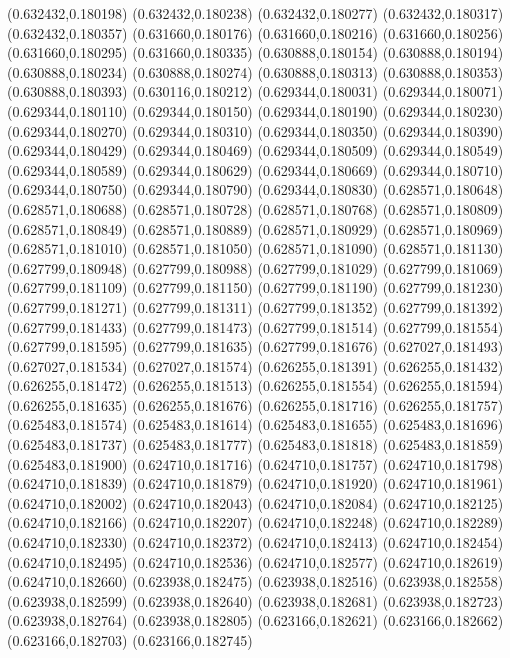 (0.632432,0.180198)
(0.632432,0.180238)
(0.632432,0.180277)
(0.632432,0.180317)
(0.632432,0.180357)
(0.631660,0.180176)
(0.631660,0.180216)
(0.631660,0.180256)
(0.631660,0.180295)
(0.631660,0.180335)
(0.630888,0.180154)
(0.630888,0.180194)
(0.630888,0.180234)
(0.630888,0.180274)
(0.630888,0.180313)
(0.630888,0.180353)
(0.630888,0.180393)
(0.630116,0.180212)
(0.629344,0.180031)
(0.629344,0.180071)
(0.629344,0.180110)
(0.629344,0.180150)
(0.629344,0.180190)
(0.629344,0.180230)
(0.629344,0.180270)
(0.629344,0.180310)
(0.629344,0.180350)
(0.629344,0.180390)
(0.629344,0.180429)
(0.629344,0.180469)
(0.629344,0.180509)
(0.629344,0.180549)
(0.629344,0.180589)
(0.629344,0.180629)
(0.629344,0.180669)
(0.629344,0.180710)
(0.629344,0.180750)
(0.629344,0.180790)
(0.629344,0.180830)
(0.628571,0.180648)
(0.628571,0.180688)
(0.628571,0.180728)
(0.628571,0.180768)
(0.628571,0.180809)
(0.628571,0.180849)
(0.628571,0.180889)
(0.628571,0.180929)
(0.628571,0.180969)
(0.628571,0.181010)
(0.628571,0.181050)
(0.628571,0.181090)
(0.628571,0.181130)
(0.627799,0.180948)
(0.627799,0.180988)
(0.627799,0.181029)
(0.627799,0.181069)
(0.627799,0.181109)
(0.627799,0.181150)
(0.627799,0.181190)
(0.627799,0.181230)
(0.627799,0.181271)
(0.627799,0.181311)
(0.627799,0.181352)
(0.627799,0.181392)
(0.627799,0.181433)
(0.627799,0.181473)
(0.627799,0.181514)
(0.627799,0.181554)
(0.627799,0.181595)
(0.627799,0.181635)
(0.627799,0.181676)
(0.627027,0.181493)
(0.627027,0.181534)
(0.627027,0.181574)
(0.626255,0.181391)
(0.626255,0.181432)
(0.626255,0.181472)
(0.626255,0.181513)
(0.626255,0.181554)
(0.626255,0.181594)
(0.626255,0.181635)
(0.626255,0.181676)
(0.626255,0.181716)
(0.626255,0.181757)
(0.625483,0.181574)
(0.625483,0.181614)
(0.625483,0.181655)
(0.625483,0.181696)
(0.625483,0.181737)
(0.625483,0.181777)
(0.625483,0.181818)
(0.625483,0.181859)
(0.625483,0.181900)
(0.624710,0.181716)
(0.624710,0.181757)
(0.624710,0.181798)
(0.624710,0.181839)
(0.624710,0.181879)
(0.624710,0.181920)
(0.624710,0.181961)
(0.624710,0.182002)
(0.624710,0.182043)
(0.624710,0.182084)
(0.624710,0.182125)
(0.624710,0.182166)
(0.624710,0.182207)
(0.624710,0.182248)
(0.624710,0.182289)
(0.624710,0.182330)
(0.624710,0.182372)
(0.624710,0.182413)
(0.624710,0.182454)
(0.624710,0.182495)
(0.624710,0.182536)
(0.624710,0.182577)
(0.624710,0.182619)
(0.624710,0.182660)
(0.623938,0.182475)
(0.623938,0.182516)
(0.623938,0.182558)
(0.623938,0.182599)
(0.623938,0.182640)
(0.623938,0.182681)
(0.623938,0.182723)
(0.623938,0.182764)
(0.623938,0.182805)
(0.623166,0.182621)
(0.623166,0.182662)
(0.623166,0.182703)
(0.623166,0.182745)
